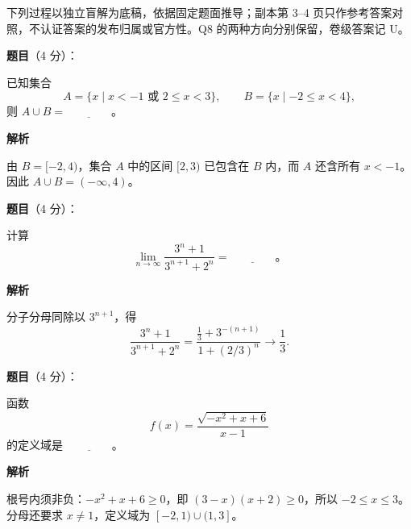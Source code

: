 

\begin{gktip}
下列过程以独立盲解为底稿，依据固定题面推导；副本第 3–4 页只作参考答案对照，不认证答案的发布归属或官方性。Q8 的两种方向分别保留，卷级答案记 U。
\end{gktip}

\begin{answer}

\textbf{题目}（4 分）：

已知集合
\nopagebreak[4]
\[
A=\{x\mid x<-1\text{ 或 }2\le x<3\},\qquad B=\{x\mid -2\le x<4\},
\]
则 \(A\cup B=\underline{\qquad\qquad}\)。

\textbf{解析}

由 $B=[-2,4)$，集合 $A$ 中的区间 $[2,3)$ 已包含在 $B$ 内，而 $A$ 还含所有 $x<-1$。因此 $A\cup B=(-\infty,4)$。


\end{answer}
\begin{answer}

\textbf{题目}（4 分）：

计算
\nopagebreak[4]
\[
\lim_{n\to\infty}\frac{3^n+1}{3^{n+1}+2^n}=\underline{\qquad\qquad}\text{。}
\]

\textbf{解析}

分子分母同除以 $3^{n+1}$，得
\nopagebreak[4]
\[
\frac{3^n+1}{3^{n+1}+2^n}
=\frac{\frac13+3^{-(n+1)}}{1+(2/3)^n}\longrightarrow\frac13.
\]


\end{answer}
\begin{answer}

\textbf{题目}（4 分）：

函数
\nopagebreak[4]
\[
f(x)=\frac{\sqrt{-x^2+x+6}}{x-1}
\]
的定义域是 \(\underline{\qquad\qquad}\)。

\textbf{解析}

根号内须非负：$-x^2+x+6\ge0$，即 $(3-x)(x+2)\ge0$，所以 $-2\le x\le3$。分母还要求 $x\ne1$，定义域为 $[-2,1)\cup(1,3]$。


\end{answer}

